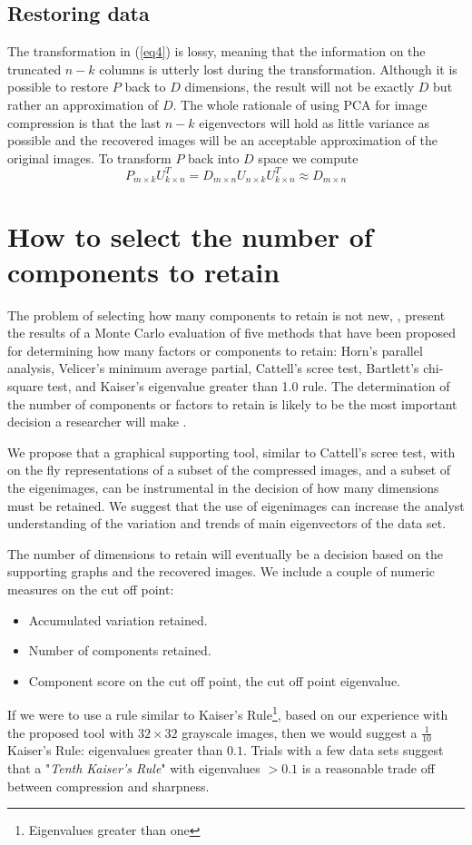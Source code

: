 \documentclass{article} %
\begin{document}
\subsection{Restoring data}
The transformation in (\ref{eq4}) is lossy, meaning that the information on the truncated $n-k$ columns is utterly lost during the transformation. Although it is possible to restore $P$ back to $D$ dimensions, the result will not be exactly $D$ but rather an approximation of $D$. The whole rationale of using PCA for image compression is that the last $n-k$ eigenvectors will hold as little variance as possible and the recovered images will be an acceptable approximation of the original images.
To transform $P$ back into $D$ space we compute \[P_{m\times k}U_{k\times n}^T = D_{m\times n}U_{n\times k}U_{k\times n}^T \approx D_{m\times n}\]
\section{How to select the number of components to retain}
The problem of selecting how many components to retain is not new, \citet{zwick1986comparison}, present the results of a Monte Carlo evaluation of five methods that have been proposed for determining how many factors or components to retain: Horn's parallel analysis, Velicer's minimum average partial, Cattell's scree test, Bartlett's chi-square test, and Kaiser's eigenvalue greater than 1.0 rule. 
The determination of the number of components or factors to retain is likely to be the most important decision a researcher will make \citep{zwick1986comparison}.\par

We propose that a graphical supporting tool, similar to Cattell's scree test, with on the fly representations of a subset of the compressed images, and a subset of the eigenimages, can be instrumental in the decision of how many dimensions must be retained. We suggest that the use of eigenimages can increase the analyst understanding of the variation and trends of main eigenvectors of the data set.\par
The number of dimensions to retain will eventually be a decision based on the supporting graphs and the recovered images. We include a couple of numeric measures on the cut off point:
\begin{itemize}
\item Accumulated variation retained.
\item Number of components retained.
\item Component score on the cut off point, the cut off point eigenvalue.
\end{itemize}
If we were to use a rule similar to Kaiser's Rule\footnote{Eigenvalues greater than one}, based on our experience with the proposed tool with $32\times 32$ grayscale images, then we would suggest a $\frac{1}{10}$ Kaiser's Rule: eigenvalues greater than $0.1$. Trials with a few data sets suggest that a "\emph{Tenth Kaiser's Rule}" with eigenvalues $> 0.1$ is a reasonable trade off between compression and sharpness.
\end{document}
